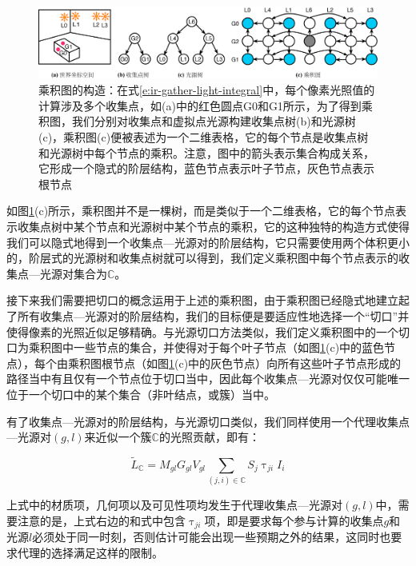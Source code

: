 \begin{figure}
\begin{fullwidth}
	\includegraphics[width=\thewidth]{figures/ir/product-graph}
	\caption{乘积图的构造：在式\ref{e:ir-gather-light-integral}中，每个像素光照值的计算涉及多个收集点，如(a)中的红色圆点G0和G1所示，为了得到乘积图，我们分别对收集点和虚拟点光源构建收集点树(b)和光源树(c)，乘积图(c)便被表述为一个二维表格，它的每个节点是收集点树和光源树中每个节点的乘积。注意，图中的箭头表示集合构成关系，它形成一个隐式的阶层结构，蓝色节点表示叶子节点，灰色节点表示根节点}
	\label{f:ir-product-graph}
\end{fullwidth}
\end{figure}

如图\ref{f:ir-product-graph}(c)所示，乘积图并不是一棵树，而是类似于一个二维表格，它的每个节点表示收集点树中某个节点和光源树中某个节点的乘积，它的这种独特的构造方式使得我们可以隐式地得到一个收集点—光源对的阶层结构，它只需要使用两个体积更小的，阶层式的光源树和收集点树就可以得到，我们定义乘积图中每个节点表示的收集点—光源对集合为$\mathds{C}$。

接下来我们需要把切口的概念运用于上述的乘积图，由于乘积图已经隐式地建立起了所有收集点—光源对的阶层结构，我们的目标便是要适应性地选择一个“切口”并使得像素的光照近似足够精确。与光源切口方法类似，我们定义乘积图中的一个切口为乘积图中一些节点的集合，并使得对于每个叶子节点（如图\ref{f:ir-product-graph}(c)中的蓝色节点），每个由乘积图根节点（如图\ref{f:ir-product-graph}(c)中的灰色节点）向所有这些叶子节点形成的路径当中有且仅有一个节点位于切口当中，因此每个收集点—光源对仅仅可能唯一位于一个切口中的某个集合（非叶结点，或簇）当中。

有了收集点—光源对的阶层结构，与光源切口类似，我们同样使用一个代理收集点—光源对$(g,l)$来近似一个簇$\mathds{C}$的光照贡献，即有：

\begin{equation}\label{e:ir-multi-sublinear}
	\tilde{L}_{\mathds{C}}=M_{gl}G_{gl}V_{gl}\sum_{(j,i)\in\mathds{C}}S_j\uptau_{ji}I_i
\end{equation}

上式中的材质项，几何项以及可见性项均发生于代理收集点—光源对$(g,l)$中，需要注意的是，上式右边的和式中包含$\uptau_{ji}$项，即是要求每个参与计算的收集点$g$和光源$l$必须处于同一时刻，否则估计可能会出现一些预期之外的结果，这同时也要求代理的选择满足这样的限制。

